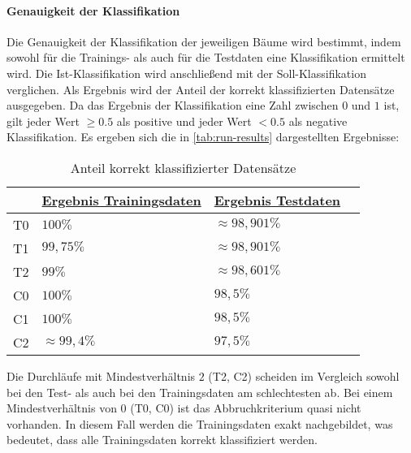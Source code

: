 \paragraph{Genauigkeit der Klassifikation}
Die Genauigkeit der Klassifikation der jeweiligen Bäume wird bestimmt,
indem sowohl für die Trainings- als auch für die Testdaten eine Klassifikation ermittelt wird.
Die Ist-Klassifikation wird anschließend mit der Soll-Klassifikation verglichen.
Als Ergebnis wird der Anteil der korrekt klassifizierten Datensätze ausgegeben.
Da das Ergebnis der Klassifikation eine Zahl zwischen $0$ und $1$ ist,
gilt jeder Wert $\geq 0.5$ als positive und jeder Wert $< 0.5$ als negative Klassifikation.
Es ergeben sich die in \autoref{tab:run-results} dargestellten Ergebnisse:

\useunder{\uline}{\ul}{}
\begin{table}[h]
    \begin{center}
        \begin{tabular}{|l|l|l|l|}
        \hline
                                & {\ul \textbf{Ergebnis Trainingsdaten}} & {\ul \textbf{Ergebnis Testdaten}} \\
            \hline
            T0                  & $100\%$                                & $\approx 98,901\%$                  \\
            \hline
            T1                  & $99,75\%$                              & $\approx 98,901\%$                  \\
            \hline
            T2                  & $99\%$                                 & $\approx 98,601\%$                  \\
            \hline
            \hline
            C0                  & $100\%$                                & $98,5\%$                  \\
            \hline
            C1                  & $100\%$                                & $98,5\%$                  \\
            \hline
            C2                  & $\approx 99,4\%$                       & $97,5\%$                  \\
            \hline
        \end{tabular}
        \caption{Anteil korrekt klassifizierter Datensätze}
        \label{tab:run-results}
    \end{center}
\end{table}

Die Durchläufe mit Mindestverhältnis $2$ (T2, C2) scheiden im Vergleich sowohl bei den Test- als auch bei den Trainingsdaten am schlechtesten ab.
Bei einem Mindestverhältnis von $0$ (T0, C0) ist das Abbruchkriterium quasi nicht vorhanden.
In diesem Fall werden die Trainingsdaten exakt nachgebildet,
was bedeutet, dass alle Trainingsdaten korrekt klassifiziert werden.

